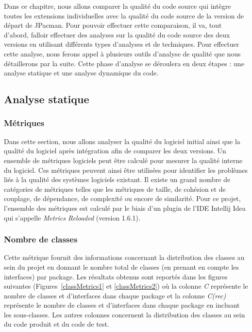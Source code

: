 \documentclass[12pt, openany]{report}
\begin{document}
Dans ce chapitre, nous allons comparer la qualité du code source qui intègre toutes les extensions individuelles avec la qualité du code source de la version de départ de JPacman. Pour pouvoir effectuer cette comparaison, il va, tout d'abord, falloir effectuer des analyses sur la qualité du code source des deux versions en utilisant différents types d'analyses et de techniques. Pour effectuer cette analyse, nous ferons appel à plusieurs outils d'analyse de qualité que nous détaillerons par la suite. Cette phase d'analyse se déroulera en deux étapes : une analyse statique et une analyse dynamique du code. 

\subsection{Analyse statique}

\subsubsection{Métriques}

Dans cette section, nous allons analyser la qualité du logiciel initial ainsi que la qualité du logiciel après intégration afin de comparer les deux versions. Un ensemble de métriques logiciels peut être calculé pour mesurer la qualité interne du logiciel. Ces métriques peuvent ainsi être utilisées pour identifier les problèmes liés à la qualité des systèmes logiciels existant. Il existe un grand nombre de catégories de métriques telles que les métriques de taille, de cohésion et de couplage, de dépendance, de complexité ou encore de similarité. Pour ce projet, l'ensemble des métriques est calculé par le biais d'un plugin de l'IDE Intellij Idea qui s'appelle \textit{Metrics Reloaded} (version 1.6.1). 

\subsubsection*{Nombre de classes}

Cette métrique fournit des informations concernant la distribution des classes au sein du projet en donnant le nombre total de classes (en prenant en compte les interfaces) par package. Les résultats obtenus sont reportés dans les figures suivantes (Figures~\ref{classMetrics1} et \ref{classMetrics2}) où la colonne \textit{C} représente le nombre de classes et d'interfaces dans chaque package et la colonne \textit{C(rec)} représente le nombre de classes et d'interfaces dans chaque package en incluant les sous-classes. Les autres colonnes concernent la distribution des classes au sein du code produit et du code de test.
\end{document}
